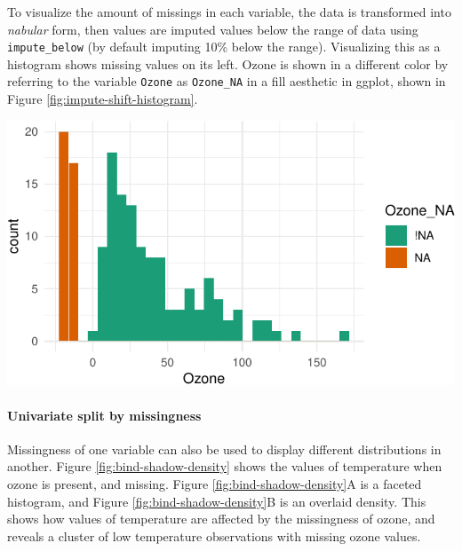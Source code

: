 \documentclass[]{article}
\let\oldparagraph\paragraph
\renewcommand{\paragraph}[1]{\oldparagraph{#1}\mbox{}}
\let\origfigure\figure
\let\endorigfigure\endfigure
\renewenvironment{figure}[1][2] {
    \expandafter\origfigure\expandafter[H]
} {
    \endorigfigure
}
\theoremstyle{definition}
\theoremstyle{definition}
\theoremstyle{definition}
\theoremstyle{remark}
\begin{document}
To visualize the amount of missings in each variable, the data is
transformed into \emph{nabular} form, then values are imputed values
below the range of data using \texttt{impute\_below} (by default
imputing 10\% below the range). Visualizing this as a histogram shows
missing values on its left. Ozone is shown in a different color by
referring to the variable \texttt{Ozone} as \texttt{Ozone\_NA} in a fill
aesthetic in ggplot, shown in Figure \ref{fig:impute-shift-histogram}.

\begin{figure}

{\centering \includegraphics[width=0.75\linewidth]{tidy-missing-data-paper_files/figure-latex/impute-shift-histogram-1} 

}

\caption{A histogram using nabular data to show the values and missings in ozone. Values are imputed below the range to show the number of missings in Ozone and colored according to missingness of ozone (`Ozone\_NA`). There are about 35 missings in Ozone.}\label{fig:impute-shift-histogram}
\end{figure}

\hypertarget{vis-split-by-miss}{%
\paragraph{Univariate split by missingness}\label{vis-split-by-miss}}

Missingness of one variable can also be used to display different
distributions in another. Figure \ref{fig:bind-shadow-density} shows the
values of temperature when ozone is present, and missing. Figure
\ref{fig:bind-shadow-density}A is a faceted histogram, and Figure
\ref{fig:bind-shadow-density}B is an overlaid density. This shows how
values of temperature are affected by the missingness of ozone, and
reveals a cluster of low temperature observations with missing ozone
values.
\end{document}
